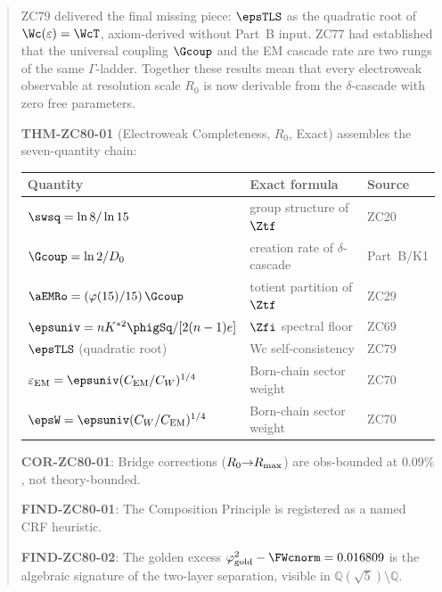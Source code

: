 \documentclass[12pt, a4paper]{article}
\renewcommand{\epsEM}{\varepsilon_{\rm EM}}
\begin{document}
\sloppy

\begin{abstract}
\sloppy
ZC79 delivered the final missing piece: $\epsTLS$ as the
quadratic root of $\Wc(\varepsilon) = \WcT$, axiom-derived
without Part~B input. ZC77 had established that the universal
coupling $\Gcoup$ and the EM cascade rate are two rungs of
the same $\Gamma$-ladder. Together these results mean that
every electroweak observable at resolution scale $R_0$ is
now derivable from the $\delta$-cascade with zero free
parameters.

\textbf{THM-ZC80-01} (Electroweak Completeness, $R_0$, Exact)
assembles the seven-quantity chain:
\begin{center}
\renewcommand{\arraystretch}{1.2}
{\small\begin{tabular}{@{}lll@{}}
\toprule
Quantity & Exact formula & Source \\
\midrule
$\swsq = \ln8/\ln15$
  & group structure of $\Ztf$ & ZC20 \\
$\Gcoup = \ln2/D_0$
  & creation rate of $\delta$-cascade & Part~B/K1 \\
$\aEMRo = (\varphi(15)/15)\,\Gcoup$
  & totient partition of $\Ztf$ & ZC29 \\
$\epsuniv = n K^{*2}\phigSq/[2(n-1)e]$
  & $\Zfi$ spectral floor & ZC69 \\
$\epsTLS$ (quadratic root)
  & Wc self-consistency & ZC79 \\
$\epsEM = \epsuniv(C_{\rm EM}/C_W)^{1/4}$
  & Born-chain sector weight & ZC70 \\
$\epsW  = \epsuniv(C_W/C_{\rm EM})^{1/4}$
  & Born-chain sector weight & ZC70 \\
\bottomrule
\end{tabular}}
\end{center}

\textbf{COR-ZC80-01}: Bridge corrections ($R_0{\to}R_{\rm max}$)
are obs-bounded at $0.09\%$, not theory-bounded.

\textbf{FIND-ZC80-01}: The Composition Principle is registered
as a named CRF heuristic.

\textbf{FIND-ZC80-02}: The golden excess
$\varphi_{\rm gold}^2 - \FWcnorm = 0.016809$ is the
algebraic signature of the two-layer separation, visible
in $\mathbb{Q}(\sqrt{5})\setminus\mathbb{Q}$.
\end{abstract}
\end{document}
